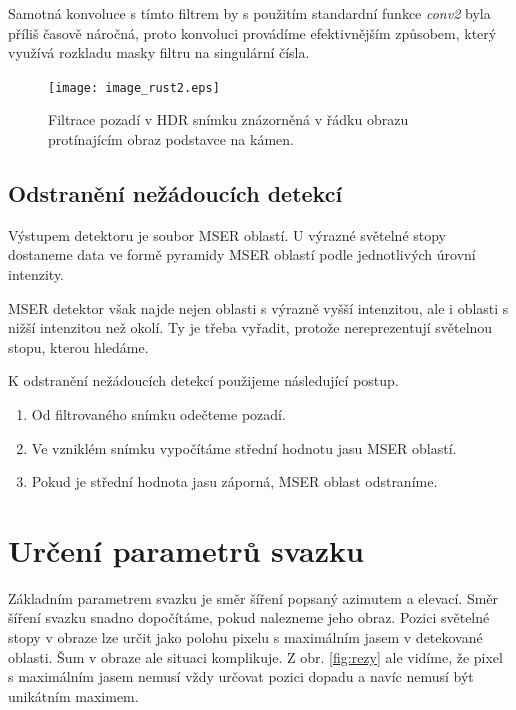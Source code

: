 	Samotná konvoluce s tímto filtrem by s použitím standardní funkce \textit{conv2} byla příliš časově náročná, proto konvoluci provádíme efektivnějším způsobem, který využívá rozkladu masky filtru na singulární čísla.
	
\begin{figure}[htbp]
    \centering\texttt{[image: image\_rust2.eps]}
     \caption[Filtrace pozadí.]{Filtrace pozadí v HDR snímku znázorněná v řádku obrazu protínajícím obraz podstavce na kámen.}
        \label{fig:pozadi}
\end{figure}
	      
\subsection{Odstranění nežádoucích detekcí}

Výstupem detektoru je soubor MSER oblastí. U výrazné světelné stopy dostaneme data ve formě pyramidy MSER oblastí podle jednotlivých úrovní intenzity. 

MSER detektor však najde nejen oblasti s výrazně vyšší intenzitou, ale i oblasti s nižší intenzitou než okolí. Ty je třeba vyřadit, protože nereprezentují světelnou stopu, kterou hledáme. 

K odstranění nežádoucích detekcí použijeme následující postup. 

\begin{enumerate}
\item Od filtrovaného snímku odečteme pozadí.

\item Ve vzniklém snímku vypočítáme střední hodnotu jasu MSER oblastí. 

\item Pokud je střední hodnota jasu záporná, MSER oblast odstraníme.  
\end{enumerate}
 	      

\section{Určení parametrů svazku}
\label{sec:beam parameters}
Základním parametrem svazku je směr šíření popsaný azimutem a elevací. Směr šíření svazku snadno dopočítáme, pokud nalezneme jeho obraz. Pozici světelné stopy v obraze lze určit jako polohu pixelu s maximálním jasem v detekované oblasti. Šum v obraze ale situaci komplikuje. Z obr. \ref{fig:rezy} ale vidíme, že pixel s maximálním jasem nemusí vždy určovat pozici dopadu a navíc nemusí být unikátním maximem.

